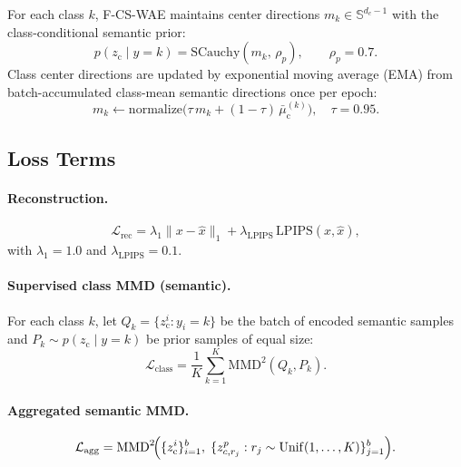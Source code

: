 \documentclass[10pt]{article}
\newcommand{\ours}{F-CS-WAE}
\newcommand{\zc}{z_{\mathrm{c}}}
\newcommand{\muc}{\mu_{\mathrm{c}}}
\newcommand{\Sph}{\mathbb{S}}
\newcommand{\MMD}{\mathrm{MMD}}
\newcommand{\SCauchy}{\mathrm{SCauchy}}
\begin{document}
For each class $k$, \ours{} maintains center directions $m_k\in\Sph^{d_c-1}$ with
the class-conditional semantic prior:
\begin{equation}
  p(\zc\mid y{=}k) = \SCauchy(m_k,\,\rho_p), \qquad \rho_p = 0.7.
  \label{eq:class-prior}
\end{equation}
Class center directions are updated by exponential moving average (EMA) from
batch-accumulated class-mean semantic directions once per epoch:
\begin{equation}
  m_k \leftarrow \mathrm{normalize}\!\bigl(\tau\,m_k + (1-\tau)\,\bar\muc^{(k)}\bigr),
  \quad \tau=0.95.
  \label{eq:ema-update}
\end{equation}

\subsection{Loss Terms}
\label{sec:losses}

\paragraph{Reconstruction.}
\begin{equation}
  \mathcal{L}_{\mathrm{rec}}
  = \lambda_1\|x-\hat{x}\|_1
  + \lambda_{\mathrm{LPIPS}}\,\mathrm{LPIPS}(x,\hat{x}),
  \label{eq:rec}
\end{equation}
with $\lambda_1=1.0$ and $\lambda_{\mathrm{LPIPS}}=0.1$.

\paragraph{Supervised class MMD (semantic).}
For each class $k$, let $Q_k=\{\zc^i:y_i=k\}$ be the batch of encoded semantic
samples and $P_k\sim p(\zc\mid y{=}k)$ be prior samples of equal size:
\begin{equation}
  \mathcal{L}_{\mathrm{class}}
  = \frac{1}{K}\sum_{k=1}^{K}\MMD^2(Q_k,P_k).
  \label{eq:class-mmd}
\end{equation}

\paragraph{Aggregated semantic MMD.}
\begin{equation}
  \mathcal{L}_{\mathrm{agg}}
  = \MMD^2\!\Bigl(\{\zc^i\}_{i=1}^{b},\;
    \{z_{c,r_j}^p : r_j\sim\mathrm{Unif}(1,\dots,K)\}_{j=1}^{b}\Bigr).
  \label{eq:agg-mmd}
\end{equation}
\end{document}
